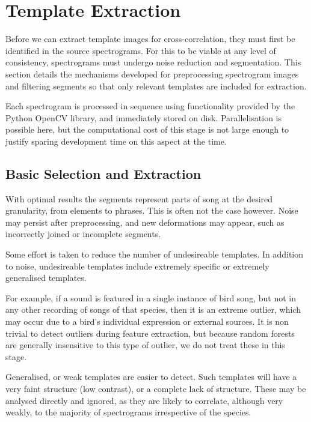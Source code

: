 \section{Template Extraction}
Before we can extract template images for cross-correlation, they must first be
identified in the source spectrograms.
For this to be viable at any level of consistency, spectrograms must undergo
noise reduction and segmentation.
This section details the mechanisms developed for preprocessing spectrogram
images and filtering segments so that only relevant templates are included for
extraction.

Each spectrogram is processed in sequence using functionality provided by the
Python OpenCV library, and immediately stored on disk.
Parallelisation is possible here, but the computational cost of this stage is
not large enough to justify sparing development time on this aspect at the time.



\subsection{Basic Selection and Extraction}\label{sec:template_select}
With optimal results the segments represent parts of song at the desired
granularity, from elements to phrases.
This is often not the case however.
Noise may persist after preprocessing, and new deformations may appear, such as
incorrectly joined or incomplete segments.

Some effort is taken to reduce the number of undesireable templates.
In addition to noise, undesireable templates include extremely specific or
extremely generalised templates.

For example, if a sound is featured in a single instance of bird song, but not
in any other recording of songs of that species, then it is an extreme outlier,
which may occur due to a bird's individual expression or external sources.
It is non trivial to detect outliers during feature extraction, but because
random forests are generally insensitive to this type of outlier, we do not
treat these in this stage.

Generalised, or weak templates are easier to detect.
Such templates will have a very faint structure (low contrast), or a complete
lack of structure.
These may be analysed directly and ignored, as they are likely to correlate,
although very weakly, to the majority of spectrograms irrespective of the
species.

